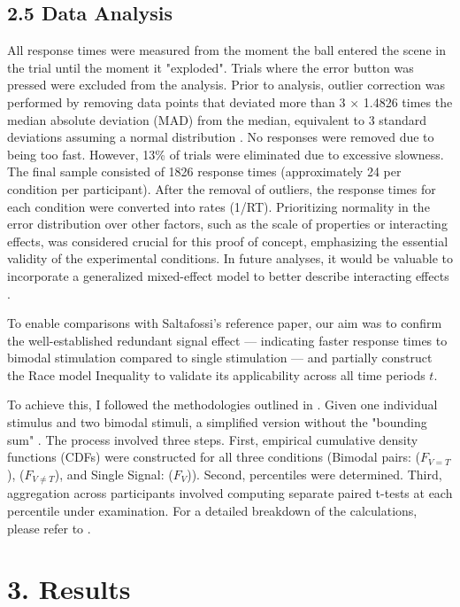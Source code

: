 \documentclass[12pt,oneside,openright]{report}
\begin{document}
\subsection*{2.5 Data Analysis}

All response times were measured from the moment the ball entered the scene in the trial until the moment it "exploded". Trials where the error button was pressed were excluded from the analysis. Prior to analysis, outlier correction was performed by removing data points that deviated more than 3 × 1.4826 times the median absolute deviation (MAD) from the median, equivalent to 3 standard deviations assuming a normal distribution \parencite{Innes2019ACA}. No responses were removed due to being too fast. However, 13\% of trials were eliminated due to excessive slowness. The final sample consisted of 1826 response times (approximately 24 per condition per participant). After the removal of outliers, the response times for each condition were converted into rates (1/RT). Prioritizing normality in the error distribution over other factors, such as the scale of properties or interacting effects, was considered crucial for this proof of concept, emphasizing the essential validity of the experimental conditions. In future analyses, it would be valuable to incorporate a generalized mixed-effect model to better describe interacting effects \parencite{Lo2015-fv}.

To enable comparisons with Saltafossi's reference paper, our aim was to confirm the well-established redundant signal effect — indicating faster response times to bimodal stimulation compared to single stimulation — and partially construct the Race model Inequality to validate its applicability across all time periods $t$.

To achieve this, I followed the methodologies outlined in \cite{Ulrich2007,Innes2019ACA}. Given one individual stimulus and two bimodal stimuli, a simplified version without the "bounding sum" . The process involved three steps. First, empirical cumulative density functions (CDFs) were constructed for all three conditions (Bimodal pairs: ($F_{V=T}$), ($F_{V \neq T}$), and Single Signal: ($F_V$)). Second, percentiles were determined. Third, aggregation across participants involved computing separate paired t-tests at each percentile under examination. For a detailed breakdown of the calculations, please refer to \cite{Ulrich2007}.

\section*{3. Results}
\end{document}
